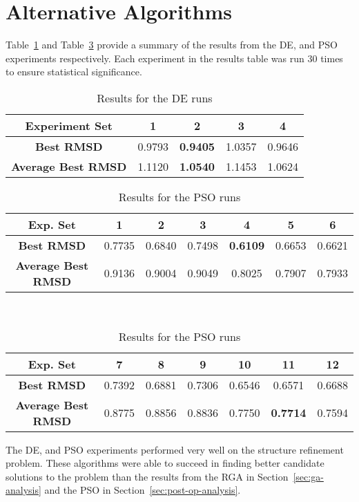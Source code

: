 \section{Alternative Algorithms}

Table~\ref{table:ea-de-results} and Table~\ref{table:ea-pso-results} provide a summary of the results from the DE, and PSO experiments respectively. Each experiment in the results table was run 30 times to ensure statistical significance.

\begin{table}
	\centering
	\begin{tabular}{ | >{\bfseries}c | c | c | c | c | }
		\hline
		Experiment Set & 1 & 2 & 3 & 4 \\ \hline
		Best RMSD & 0.9793 & \textbf{0.9405} & 1.0357 & 0.9646 \\ \hline
		Average Best RMSD & 1.1120 & \textbf{1.0540} & 1.1453 & 1.0624 \\ \hline
	\end{tabular}
	\caption{Results for the DE runs}
	\label{table:ea-de-results}
\end{table}

\begin{table}
	\centering
	\begin{tabular}{ | >{\bfseries}c | c | c | c | c | c | c | }
		\hline
		Exp. Set & 1 & 2 & 3 & 4 & 5 & 6 \\ \hline
		Best RMSD & 0.7735 & 0.6840 & 0.7498 & \textbf{0.6109} & 0.6653 & 0.6621 \\ \hline
		Average Best RMSD & 0.9136 & 0.9004 & 0.9049 & 0.8025 & 0.7907 & 0.7933 \\ \hline
	\end{tabular}
	\\
	\vspace{3 mm}
	\begin{tabular}{ | >{\bfseries}c | c | c | c | c | c | c | }
		\hline
		Exp. Set & 7 & 8 & 9 & 10 & 11 & 12 \\ \hline
		Best RMSD & 0.7392 & 0.6881 & 0.7306 & 0.6546 & 0.6571 & 0.6688 \\ \hline
		Average Best RMSD & 0.8775 & 0.8856 & 0.8836 & 0.7750 & \textbf{0.7714} & 0.7594 \\ \hline
	\end{tabular}
	\caption{Results for the PSO runs}
	\label{table:ea-pso-results}
\end{table}

The DE, and PSO experiments performed very well on the structure refinement problem. These algorithms were able to succeed in finding better candidate solutions to the problem than the results from the RGA in Section~\ref{sec:ga-analysis} and the PSO in Section~\ref{sec:post-op-analysis}.

